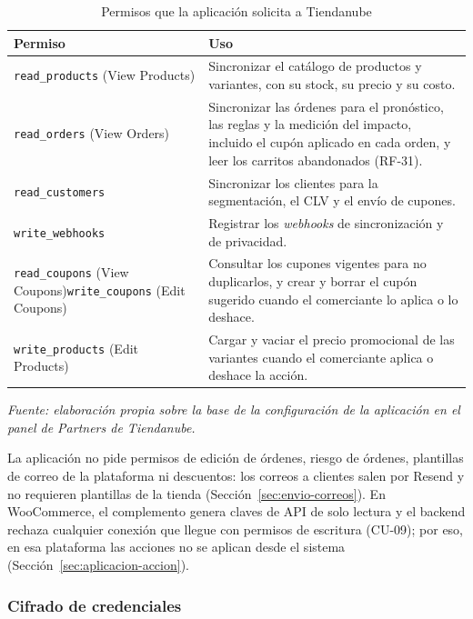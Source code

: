 \begin{table}[!htbp]
\centering
\caption{Permisos que la aplicación solicita a Tiendanube}
\label{tab:permisos-app}
\renewcommand{\arraystretch}{1.3}
\begin{tabular}{|m{3.4cm}|m{11cm}|}
\hline
\textbf{Permiso} & \textbf{Uso} \\
\hline
\texttt{read\_products} (View Products) & Sincronizar el catálogo de productos y variantes, con su stock, su precio y su costo. \\
\hline
\texttt{read\_orders} (View Orders) & Sincronizar las órdenes para el pronóstico, las reglas y la medición del impacto, incluido el cupón aplicado en cada orden, y leer los carritos abandonados (RF-31). \\
\hline
\texttt{read\_customers} & Sincronizar los clientes para la segmentación, el CLV y el envío de cupones. \\
\hline
\texttt{write\_webhooks} & Registrar los \emph{webhooks} de sincronización y de privacidad. \\
\hline
\texttt{read\_coupons} (View Coupons)\newline\texttt{write\_coupons} (Edit Coupons) & Consultar los cupones vigentes para no duplicarlos, y crear y borrar el cupón sugerido cuando el comerciante lo aplica o lo deshace. \\
\hline
\texttt{write\_products} (Edit Products) & Cargar y vaciar el precio promocional de las variantes cuando el comerciante aplica o deshace la acción. \\
\hline
\end{tabular}

\smallskip
\noindent\textit{Fuente: elaboración propia sobre la base de la configuración de la aplicación en el panel de Partners de Tiendanube.}
\end{table}

La aplicación no pide permisos de edición de órdenes, riesgo de órdenes, plantillas de correo de la plataforma ni descuentos: los correos a clientes salen por Resend y no requieren plantillas de la tienda (Sección~\ref{sec:envio-correos}). En WooCommerce, el complemento genera claves de API de solo lectura y el backend rechaza cualquier conexión que llegue con permisos de escritura (CU-09); por eso, en esa plataforma las acciones no se aplican desde el sistema (Sección~\ref{sec:aplicacion-accion}).

\subsubsection{Cifrado de credenciales}
\label{sec:cifrado-credenciales}


